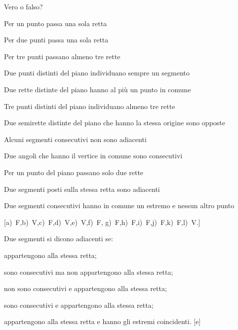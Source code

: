 \begin{esercizio}
\label{ese:1.49}
Vero o falso?
\vspace{-.5em}
\begin{enumeratea}
\item Per un punto passa una sola retta \hfill\boxV\quad\boxF
\item Per due punti passa una sola retta \hfill\boxV\quad\boxF
\item Per tre punti passano almeno tre rette \hfill\boxV\quad\boxF
\item Due punti distinti del piano individuano sempre un segmento
\hfill\boxV\quad\boxF
\item Due rette distinte del piano hanno al più un punto in comune 
\hfill\boxV\quad\boxF
\item Tre punti distinti del piano individuano almeno tre rette
\hfill\boxV\quad\boxF
\item Due semirette distinte del piano che hanno la stessa origine 
sono opposte \hfill\boxV\quad\boxF
\item Alcuni segmenti consecutivi non sono adiacenti
\hfill\boxV\quad\boxF
\item Due angoli che hanno il vertice in comune sono consecutivi 
\hfill\boxV\quad\boxF
\item Per un punto del piano passano solo due rette
\hfill\boxV\quad\boxF
\item Due segmenti posti sulla stessa retta sono adiacenti
\hfill\boxV\quad\boxF
\item Due segmenti consecutivi hanno in comune un estremo e nessun altro punto 
\hfill\boxV\quad\boxF
\end{enumeratea}
 \hfill[a)~F,\quad b)~V,\quad c)~F,\quad d)~V,\quad e)~V,\quad f)~F,\quad 
g)~F,\quad h)~F,\quad i)~F,\quad j)~F,\quad k)~F,\quad l)~V.]
\end{esercizio}

\begin{esercizio}
\label{ese:1.50}
Due segmenti si dicono adiacenti se:
\begin{enumeratea}
\item appartengono alla stessa retta;
\item sono consecutivi ma non appartengono alla stessa retta;
\item non sono consecutivi e appartengono alla stessa retta;
\item sono consecutivi e appartengono alla stessa retta;
\item appartengono alla stessa retta e hanno gli estremi coincidenti.
\hfill[e]
\end{enumeratea}
\end{esercizio}

